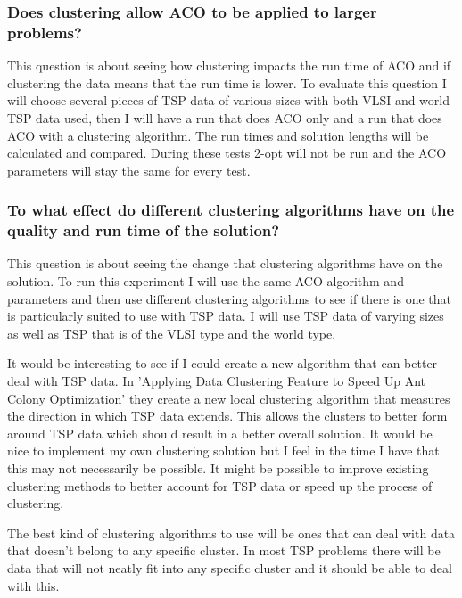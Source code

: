 \subsubsection{Does clustering allow ACO to be applied to larger problems?}

This question is about seeing how clustering impacts the run time of ACO and if clustering the data means that the run time is lower. To evaluate this question I will choose several pieces of TSP data of various sizes with both VLSI and world TSP data used, then I will have a run that does ACO only and a run that does ACO with a clustering algorithm. The run times and solution lengths will be calculated and compared. During these tests 2-opt will not be run and the ACO parameters will stay the same for every test.

\subsubsection{To what effect do different clustering algorithms have on the quality and run time of the solution?}

This question is about seeing the change that clustering algorithms have on the solution. To run this experiment I will use the same ACO algorithm and parameters and then use different clustering algorithms to see if there is one that is particularly suited to use with TSP data. I will use TSP data of varying sizes as well as TSP that is of the VLSI type and the world type. 

It would be interesting to see if I could create a new algorithm that can better deal with TSP data. In 'Applying Data Clustering Feature to Speed Up Ant Colony Optimization'\cite{pang_chao-yang_ben-qiong_zhang_jie_wei_shan_zheng-chao_2014} they create a new local clustering algorithm that measures the direction in which TSP data extends. This allows the clusters to better form around TSP data which should result in a better overall solution. It would be nice to implement my own clustering solution but I feel in the time I have that this may not necessarily be possible. It might be possible to improve existing clustering methods to better account for TSP data or speed up the process of clustering. 

The best kind of clustering algorithms to use will be ones that can deal with data that doesn't belong to any specific cluster. In most TSP problems there will be data that will not neatly fit into any specific cluster and it should be able to deal with this.

